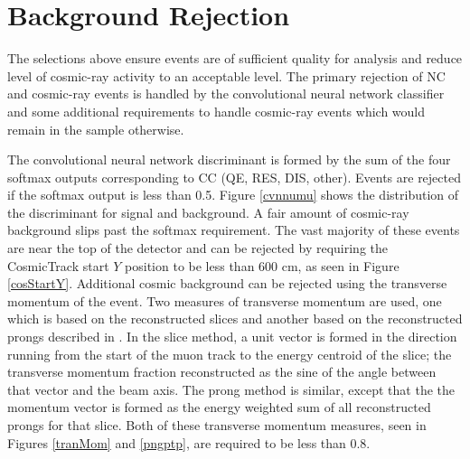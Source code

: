 \section{Background Rejection}
\label{background_rejection_section}

The selections above ensure events are of sufficient quality for analysis
and reduce level of cosmic-ray activity to an acceptable level.
The primary rejection of NC and cosmic-ray events is handled by
the convolutional neural network classifier and some additional requirements
to handle cosmic-ray events which would remain in the sample otherwise.

The convolutional neural network discriminant is formed by the sum of the four
softmax outputs corresponding to \numu CC (QE, RES, DIS, other).
Events are rejected if the softmax output is less than 0.5.
Figure \ref{cvnnumu} shows the distribution of the discriminant for
signal and background.
A fair amount of cosmic-ray background slips past the softmax requirement.
The vast majority of these events are near the top of the detector
and can be rejected by requiring the CosmicTrack start $Y$ position to be less
than 600 cm, as seen in Figure \ref{cosStartY}.
Additional cosmic background can be rejected using the transverse momentum
of the event.
Two measures of transverse momentum are used, one which is based
on the reconstructed slices and another based on the reconstructed prongs
described in \cite{niner2015thesis}.
In the slice method, a unit vector is formed in the direction running
from the start of the muon track to the energy centroid of the slice;
the transverse momentum fraction reconstructed as the sine of the angle
between that vector and the beam axis.
The prong method is similar, except that the the momentum vector
is formed as the energy weighted sum of all reconstructed prongs
for that slice.
Both of these transverse momentum measures, seen in Figures \ref{tranMom} and
\ref{pngptp}, are required to be less than 0.8.



